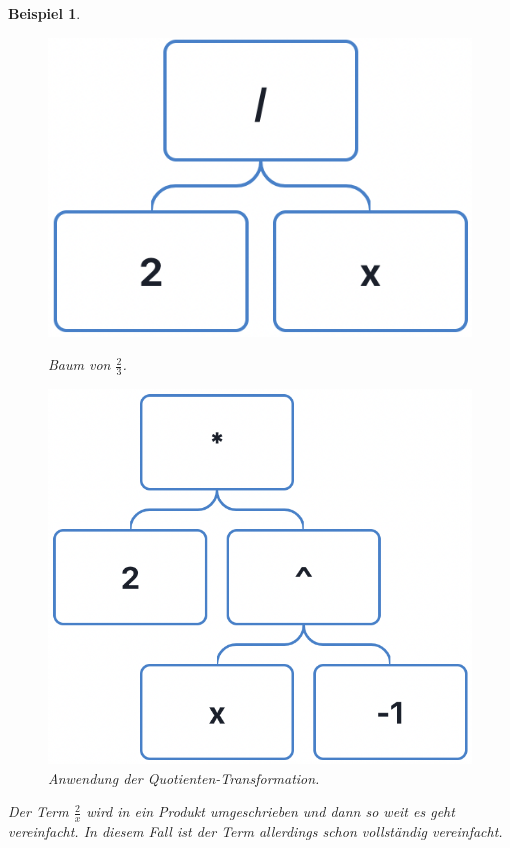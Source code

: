 \documentclass[11pt]{article}
\newtheorem{example}{Beispiel}
\begin{document}
\begin{example}
  \begin{figure}[h]
    \begin{minipage}{.5\textwidth}
      \centering
      \includegraphics[scale=0.4]{trees/division/beispiel_1_1.png}
      \caption{Baum von $\frac{2}{3}$.}
    \end{minipage}
    \begin{minipage}{.5\textwidth}
      \centering
      \includegraphics[scale=0.4]{trees/division/beispiel_1_2.png}
      \caption{Anwendung der Quotienten-Transformation.}
    \end{minipage}
  \end{figure}
  Der Term $\frac{2}{x}$ wird in ein Produkt umgeschrieben und dann so weit es geht vereinfacht. In diesem Fall
  ist der Term allerdings schon vollständig vereinfacht.
\end{example}
\end{document}
